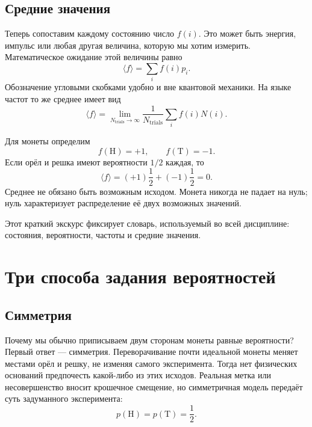 \subsection{Средние значения}

Теперь сопоставим каждому состоянию число \(f(i)\). Это может быть энергия, импульс или любая другая величина, которую мы хотим измерить. Математическое ожидание этой величины равно
\begin{equation}
 \langle f\rangle=\sum_i f(i)p_i.
 \label{eq:sm1-expectation}
\end{equation}
Обозначение угловыми скобками удобно и вне квантовой механики. На языке частот то же среднее имеет вид
\begin{equation}
 \langle f\rangle
 =
 \lim_{N_{\mathrm{trials}}\to\infty}
 \frac{1}{N_{\mathrm{trials}}}
 \sum_i f(i)N(i).
 \label{eq:sm1-frequency-average}
\end{equation}

Для монеты определим
\begin{equation}
 f(\mathrm{H})=+1,
 \qquad
 f(\mathrm{T})=-1.
\end{equation}
Если орёл и решка имеют вероятности \(1/2\) каждая, то
\begin{equation}
 \langle f\rangle
 =(+1)\frac12+(-1)\frac12=0.
\end{equation}
Среднее не обязано быть возможным исходом. Монета никогда не падает на нуль; нуль характеризует распределение её двух возможных значений.

Этот краткий экскурс фиксирует словарь, используемый во всей дисциплине: состояния, вероятности, частоты и средние значения.

\section{Три способа задания вероятностей}

\subsection{Симметрия}

Почему мы обычно приписываем двум сторонам монеты равные вероятности? Первый ответ — симметрия. Переворачивание почти идеальной монеты меняет местами орёл и решку, не изменяя самого эксперимента. Тогда нет физических оснований предпочесть какой-либо из этих исходов. Реальная метка или несовершенство вносит крошечное смещение, но симметричная модель передаёт суть задуманного эксперимента:
\begin{equation}
 p(\mathrm{H})=p(\mathrm{T})=\frac12.
\end{equation}

